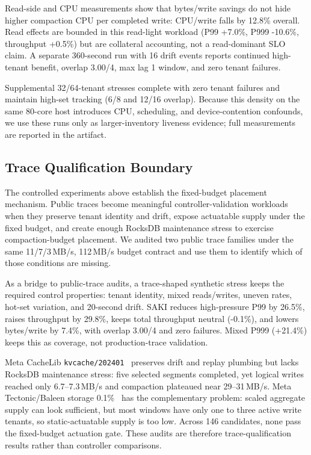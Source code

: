 Read-side and CPU measurements show that bytes/write savings do not hide
higher compaction CPU per completed write: CPU/write falls by 12.8\% overall.
Read effects are bounded in this read-light workload (P99 +7.0\%, P999
-10.6\%, throughput +0.5\%) but are collateral accounting, not a
read-dominant SLO claim. A separate 360-second run with 16 drift events reports
continued high-tenant benefit, overlap 3.00/4, max lag 1 window, and zero
tenant failures.

Supplemental 32/64-tenant stresses complete with zero tenant failures and
maintain high-set tracking (6/8 and 12/16 overlap). Because this density on the
same 80-core host introduces CPU, scheduling, and device-contention confounds,
we use these runs only as larger-inventory liveness evidence; full measurements
are reported in the artifact.

\subsection{Trace Qualification Boundary}
\label{sec:public-trace}

The controlled experiments above establish the fixed-budget placement
mechanism. Public traces become meaningful controller-validation workloads
when they preserve tenant identity and drift, expose actuatable supply under
the fixed budget, and create enough RocksDB maintenance stress to exercise
compaction-budget placement. We audited two public trace families under the
same 11/7/3\,MB/s, 112\,MB/s budget contract and use them to identify which of
those conditions are missing.

As a bridge to public-trace audits, a trace-shaped synthetic stress keeps the
required control properties: tenant identity, mixed reads/writes, uneven rates,
hot-set variation, and 20-second drift. SAKI reduces high-pressure P99 by
26.5\%, raises throughput by 29.8\%, keeps total throughput neutral (-0.1\%),
and lowers bytes/write by 7.4\%, with overlap 3.00/4 and zero failures. Mixed
P999 (+21.4\%) keeps this as coverage, not production-trace validation.

Meta CacheLib \texttt{kvcache/202401}~\cite{cachelib_trace} preserves drift
and replay plumbing but lacks RocksDB maintenance stress: five selected
segments completed, yet logical writes reached only 6.7--7.3\,MB/s and
compaction plateaued near 29--31\,MB/s. Meta Tectonic/Baleen storage
0.1\%~\cite{baleen_fast24} has the complementary problem: scaled aggregate
supply can look sufficient, but most windows have only one to three active
write tenants, so static-actuatable supply is too low. Across 146 candidates,
none pass the fixed-budget actuation gate. These audits are therefore
trace-qualification results rather than controller comparisons.
